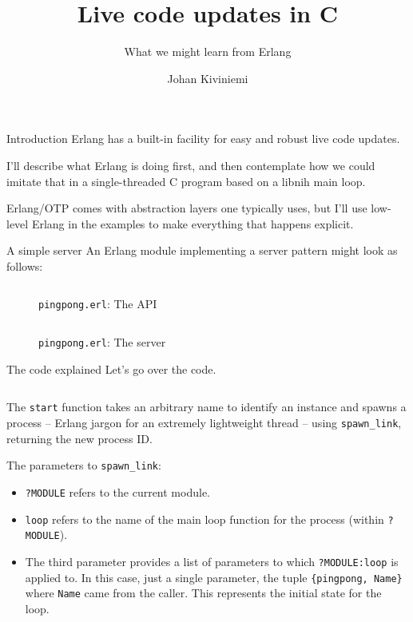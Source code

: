 \documentclass{beamer}
\title{Live code updates in C}
\subtitle{What we might learn from Erlang}
\author{Johan Kiviniemi}
\begin{document}
\begin{frame}[plain]
  \titlepage
\end{frame}

\begin{frame}{Introduction}
  Erlang has a built-in facility for easy and robust live code updates.

  I’ll describe what Erlang is doing first, and then contemplate how we could
  imitate that in a single-threaded C program based on a libnih main loop.

  Erlang/OTP comes with abstraction layers one typically uses, but I’ll use
  low-level Erlang in the examples to make everything that happens explicit.
\end{frame}

\begin{frame}[fragile]{A simple server}
  An Erlang module implementing a server pattern might look as follows:

  \begin{figure}[H]
    \inputminted[lastline=13]{erlang}{pingpong-00.erl}
    \caption{\texttt{pingpong.erl}: The API}
  \end{figure}
\end{frame}

\begin{frame}[fragile]
  \begin{figure}[H]
    \inputminted[firstline=15]{erlang}{pingpong-00.erl}
    \caption{\texttt{pingpong.erl}: The server}
  \end{figure}
\end{frame}

\begin{frame}[fragile]{The code explained}
  Let’s go over the code.

  \inputminted[firstline=6,lastline=7]{erlang}{pingpong-00.erl}

  The \verb|start| function takes an arbitrary name to identify an instance and
  spawns a process – Erlang jargon for an extremely lightweight thread – using
  \verb|spawn_link|, returning the new process ID.

  The parameters to \verb|spawn_link|:

  \begin{itemize}
    \item \verb|?MODULE| refers to the current module.

    \item \verb|loop| refers to the name of the main loop function for the
    process (within \verb|?MODULE|).

    \item The third parameter provides a list of parameters to which
    \verb|?MODULE:loop| is applied to. In this case, just a single parameter,
    the tuple \verb|{pingpong, Name}| where \verb|Name| came from the caller.
    This represents the initial state for the loop.
  \end{itemize}
\end{frame}
\end{document}
